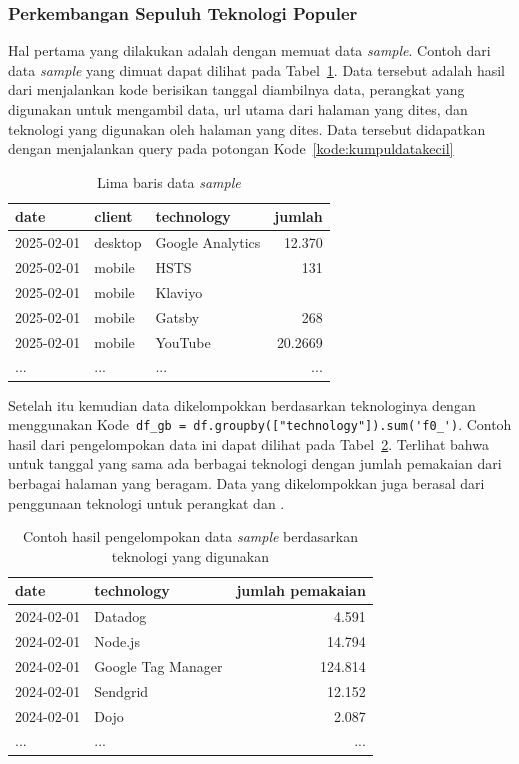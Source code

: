 \subsubsection{Perkembangan Sepuluh Teknologi Populer}
\label{subsub: 10semua}
Hal pertama yang dilakukan adalah dengan memuat data \textit{sample}. Contoh dari data \textit{sample} yang dimuat dapat dilihat pada Tabel~\ref{tab:sample}. Data tersebut adalah hasil dari menjalankan kode berisikan tanggal diambilnya data, perangkat yang digunakan untuk mengambil data, url utama dari halaman \web yang dites, dan teknologi yang digunakan oleh halaman \web yang dites. Data tersebut didapatkan dengan menjalankan query pada potongan Kode~\ref{kode:kumpuldatakecil} 
\begin{table}[H]
    \centering
    \caption{Lima baris data \textit{sample}}
    \label{tab:sample}
    \begin{tabular}{|l|l|l|r|}
        \hline
        date & client & technology & jumlah \\ \hline
        2025-02-01 & desktop & Google Analytics & 12.370 \\ \hline
        2025-02-01 & mobile &  HSTS & 131\\ \hline
        2025-02-01 & mobile &  Klaviyo &  \\ \hline
        2025-02-01 & mobile & Gatsby & 268 \\ \hline
        2025-02-01 & mobile &  YouTube & 20.2669 \\ \hline
        ...&...&...&... \\ \hline
    \end{tabular}
\end{table}

Setelah itu kemudian data dikelompokkan berdasarkan teknologinya dengan menggunakan Kode~\verb|df_gb = df.groupby(["technology"]).sum('f0_')|. Contoh hasil dari pengelompokan data ini dapat dilihat pada Tabel~\ref{tab:gbsample}. Terlihat bahwa untuk tanggal yang sama ada berbagai teknologi dengan jumlah pemakaian dari berbagai halaman \web yang beragam. Data yang dikelompokkan juga berasal dari penggunaan teknologi untuk perangkat \mobile dan \desktop.
\begin{table}[H]
    \centering
    \caption{Contoh hasil pengelompokan data \textit{sample} berdasarkan teknologi yang digunakan}
    \label{tab:gbsample}
    \begin{tabular}{|l|l|r|}
        \hline
        date & technology & jumlah pemakaian \\ \hline
        2024-02-01 & Datadog & 4.591 \\ \hline
        2024-02-01 & Node.js & 14.794 \\ \hline
        2024-02-01 & Google Tag Manager & 124.814 \\ \hline
        2024-02-01 & Sendgrid & 12.152 \\ \hline
        2024-02-01 & Dojo & 2.087 \\ \hline
        ...&...&... \\ \hline
    \end{tabular}
\end{table}

